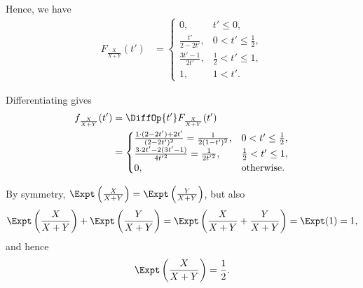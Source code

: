 \begin{enumerate}
          Hence, we have
          \begin{align*}
              F_{\frac{X}{X + Y}}(t') & = \begin{cases}
                                              0,                   & t' \leq 0,               \\
                                              \frac{t'}{2 - 2t'},  & 0 < t' \leq \frac{1}{2}, \\
                                              \frac{3t' - 1}{2t'}, & \frac{1}{2} < t' \leq 1, \\
                                              1,                   & 1 < t'.
                                          \end{cases}
          \end{align*}

          Differentiating gives
          \begin{align*}
              f_{\frac{X}{X + Y}}(t') & = \DiffOp{t'} F_{\frac{X}{X + Y}}(t')                                                                                                                \\
                                      & = \begin{cases}
                                              \frac{1 \cdot (2 - 2t') + 2 t'}{(2 - 2t')^2} = \frac{1}{2 (1 - t')^2}, & 0 < t' \leq \frac{1}{2}, \\
                                              \frac{3 \cdot 2t' - 2 (3t' - 1)}{4{t'}^2} = \frac{1}{2 {t'}^2},        & \frac{1}{2} < t' \leq 1, \\
                                              0,                                                                     & \text{otherwise}.
                                          \end{cases}
          \end{align*}

          By symmetry, \(\Expt\left(\frac{X}{X + Y}\right) = \Expt\left(\frac{Y}{X + Y}\right)\), but also
          \[
              \Expt\left(\frac{X}{X + Y}\right) + \Expt\left(\frac{Y}{X + Y}\right) = \Expt\left(\frac{X}{X + Y} + \frac{Y}{X + Y}\right) = \Expt(1) = 1,
          \]
          and hence
          \[
              \Expt\left(\frac{X}{X + Y}\right) = \frac{1}{2}.
          \]


\end{enumerate}
